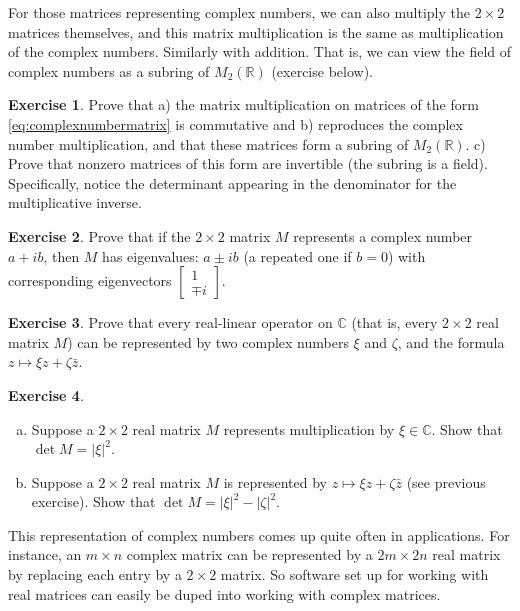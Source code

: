 \documentclass[12pt,openany]{book}
\newcommand{\sabs}[1]{\lvert {#1} \rvert}
\newcommand{\C}{{\mathbb{C}}}
\newcommand{\R}{{\mathbb{R}}}
\theoremstyle{plain}
\theoremstyle{remark}
\theoremstyle{definition}
\newenvironment{exbox}{%
    \def\FrameCommand{\vrule width 1pt \relax\hspace{10pt}}%
    \MakeFramed{\advance\hsize-\width\FrameRestore}%
}{%
    \endMakeFramed
}
\newenvironment{exparts}{%
    \leavevmode\begin{enumerate}[a),noitemsep,topsep=0pt,parsep=0pt,partopsep=0pt]
}{%
    \end{enumerate}
}
\theoremstyle{exercise}
\newtheorem{exercise}{Exercise}[section]
\theoremstyle{example}
\begin{document}
For those matrices representing complex numbers,
we can also multiply the $2 \times 2$ matrices themselves,
and this matrix multiplication is the same as multiplication of the complex
numbers.  Similarly with addition.
That is, we can view the field of complex numbers as a subring of $M_2(\R)$
(exercise below).

\begin{exbox}
\begin{exercise}
Prove that a) the matrix multiplication on matrices of the form
\eqref{eq:complexnumbermatrix}
is commutative and b) reproduces the complex
number multiplication, and that these matrices form a subring of $M_2(\R)$.
c) Prove that nonzero matrices of this form are
invertible (the subring is a field).  Specifically, notice the
determinant appearing in the denominator for the multiplicative inverse.
\end{exercise}

\begin{exercise}
Prove that if the $2 \times 2$ matrix $M$ represents a complex number
$a+ib$, then $M$ has eigenvalues: $a \pm i b$ (a repeated one if $b=0$)
with corresponding
eigenvectors $\left[ \begin{smallmatrix} 1 \\ \mp i \end{smallmatrix}
\right]$.
\end{exercise}

\begin{exercise} \label{exercise:reallinmap}
Prove that every real-linear operator on $\C$ (that is, every 
$2 \times 2$ real matrix $M$) can be represented 
by two complex numbers $\xi$ and $\zeta$, and the formula
$z \mapsto \xi z + \zeta \bar{z}$.
\end{exercise}

\begin{exercise}
\begin{exparts}
\item
Suppose a $2 \times 2$ real matrix $M$ represents multiplication by $\xi \in \C$.
Show that $\det M = \sabs{\xi}^2$.
\item
Suppose a $2 \times 2$ real matrix $M$ is represented by $z \mapsto \xi z + \zeta
\bar{z}$ (see previous exercise).
Show that $\det M = \sabs{\xi}^2 - \sabs{\zeta}^2$.
\end{exparts}
\end{exercise}
\end{exbox}

This representation of complex numbers comes up quite often in applications.
For instance, 
an $m \times n$ complex matrix can be represented by a
$2m \times 2n$ real matrix by replacing each entry by a $2 \times 2$ matrix.
So software set up for working with real matrices can easily be duped into
working with complex matrices.
\end{document}
